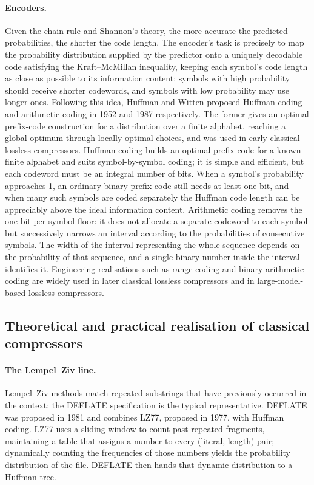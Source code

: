 \documentclass[12pt,a4paper]{article}
\begin{document}
\paragraph{Encoders.}
Given the chain rule and Shannon's theory, the more accurate the predicted probabilities,
the shorter the code length. The encoder's task is precisely to map the probability
distribution supplied by the predictor onto a uniquely decodable code satisfying the
Kraft--McMillan inequality, keeping each symbol's code length as close as possible to its
information content: symbols with high probability should receive shorter codewords, and
symbols with low probability may use longer ones. Following this idea, Huffman and Witten
proposed Huffman coding and arithmetic coding in 1952 and 1987 respectively. The former
gives an optimal prefix-code construction for a distribution over a finite alphabet,
reaching a global optimum through locally optimal choices, and was used in early classical
lossless compressors. Huffman coding builds an optimal prefix code for a known finite
alphabet and suits symbol-by-symbol coding; it is simple and efficient, but each codeword
must be an integral number of bits. When a symbol's probability approaches 1, an ordinary
binary prefix code still needs at least one bit, and when many such symbols are coded
separately the Huffman code length can be appreciably above the ideal information content.
Arithmetic coding removes the one-bit-per-symbol floor: it does not allocate a separate
codeword to each symbol but successively narrows an interval according to the probabilities
of consecutive symbols. The width of the interval representing the whole sequence depends on
the probability of that sequence, and a single binary number inside the interval identifies
it. Engineering realisations such as range coding and binary arithmetic coding are widely
used in later classical lossless compressors and in large-model-based lossless compressors.

\subsection{Theoretical and practical realisation of classical compressors}

\paragraph{The Lempel--Ziv line.}
Lempel--Ziv methods match repeated substrings that have previously occurred in the context;
the DEFLATE specification is the typical representative. DEFLATE was proposed in 1981 and
combines LZ77, proposed in 1977, with Huffman coding. LZ77 uses a sliding window to count
past repeated fragments, maintaining a table that assigns a number to every (literal,
length) pair; dynamically counting the frequencies of those numbers yields the probability
distribution of the file. DEFLATE then hands that dynamic distribution to a Huffman tree.
\end{document}
